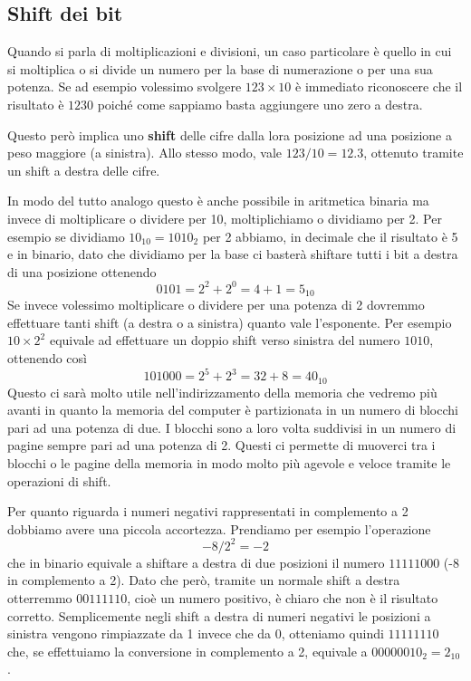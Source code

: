 \subsection{Shift dei bit}
Quando si parla di moltiplicazioni e divisioni, un caso particolare è quello in cui si moltiplica
o si divide un numero per la base di numerazione o per una sua potenza. Se ad esempio volessimo
svolgere $123 \times 10$ è immediato riconoscere che il risultato è $1230$ poiché come sappiamo
basta aggiungere uno zero a destra.

Questo però implica uno \textbf{shift} delle cifre dalla lora posizione ad una posizione a peso
maggiore (a sinistra). Allo stesso modo, vale $123 / 10 = 12.3$, ottenuto tramite un shift a destra
delle cifre.

In modo del tutto analogo questo è anche possibile in aritmetica binaria ma invece di moltiplicare
o dividere per 10, moltiplichiamo o dividiamo per 2. Per esempio se dividiamo $10_{10} = 1010_2$
per 2 abbiamo, in decimale che il risultato è 5 e in binario, dato che dividiamo per la base ci
basterà shiftare tutti i bit a destra di una posizione ottenendo
\[ 0101 = 2^2 + 2^0 = 4 + 1 = 5_{10} \]
Se invece volessimo moltiplicare o dividere per una potenza di 2 dovremmo effettuare tanti shift
(a destra o a sinistra) quanto vale l'esponente. Per esempio $10 \times 2^2$ equivale ad effettuare
un doppio shift verso sinistra del numero $1010$, ottenendo così
\[ 101000 = 2^5 + 2^3 = 32 + 8 = 40_{10} \]
Questo ci sarà molto utile nell'indirizzamento della memoria che vedremo più avanti in quanto la
memoria del computer è partizionata in un numero di blocchi pari ad una potenza di due. I blocchi
sono a loro volta suddivisi in un numero di pagine sempre pari ad una potenza di 2. Questi ci
permette di muoverci tra i blocchi o le pagine della memoria in modo molto più agevole e veloce
tramite le operazioni di shift.

Per quanto riguarda i numeri negativi rappresentati in complemento a 2 dobbiamo avere una piccola
accortezza. Prendiamo per esempio l'operazione
\[ -8 / 2^2 = -2 \]
che in binario equivale a shiftare a destra di due posizioni il numero $11111000$ (-8 in
complemento a 2). Dato che però, tramite un normale shift a destra otterremmo $00111110$, cioè un
numero positivo, è chiaro che non è il risultato corretto. Semplicemente negli shift a destra di
numeri negativi le posizioni a sinistra vengono rimpiazzate da 1 invece che da 0, otteniamo quindi
$11111110$ che, se effettuiamo la conversione in complemento a 2, equivale a $00000010_2 = 2_{10}$.

